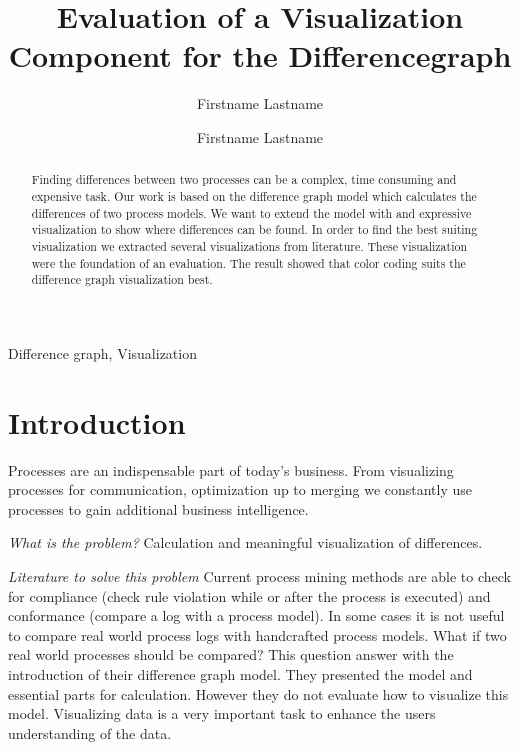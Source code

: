 \documentclass{llncs}
\begin{document}
\title{Evaluation of a Visualization Component for the Differencegraph}
\author{Firstname Lastname \and Firstname Lastname}
\maketitle
\begin{abstract}
Finding differences between two processes can be a complex, time consuming and expensive task. Our work is based on the difference graph model which calculates the differences of two process models. We want to extend the model with and expressive visualization to show where differences can be found. In order to find the best suiting visualization we extracted several visualizations from literature. These visualization were the foundation of an evaluation. The result showed that color coding suits the difference graph visualization best.
\end{abstract}

\begin{keywords}
	Difference graph, Visualization
\end{keywords}

\section{Introduction}
\label{sec:Introduction} %

Processes are an indispensable part of today’s business. From visualizing processes for communication, optimization up to merging we constantly use processes to gain additional business intelligence.

\textit{What is the problem?}
Calculation and meaningful visualization of differences.


\textit{Literature to solve this problem}
Current process mining methods are able to check for compliance (check rule violation while or after the process is executed) and conformance (compare a log with a process model).
In some cases it is not useful to compare real world process logs with handcrafted process models. What if two real world processes should be compared?
This question answer \cite{lit:VisuApprDiffAnalysis} with the introduction of their difference graph model. They presented the model and essential parts for calculation. However they do not evaluate how to visualize this model. Visualizing data is a very important task to enhance the users understanding of the data.
\end{document}
